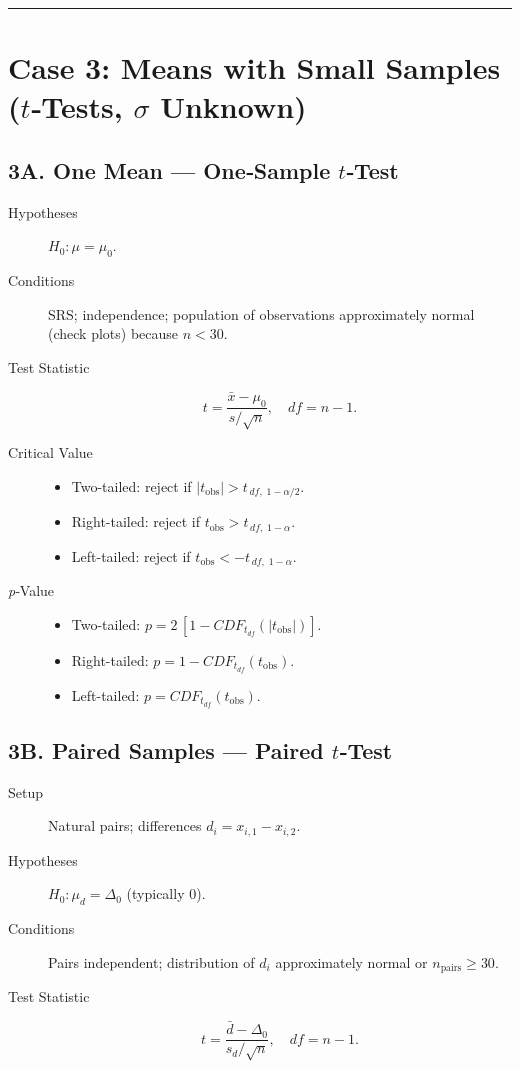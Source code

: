\documentclass[12pt]{article}
\begin{document}
\bigskip\hrule\bigskip

\section*{Case 3: Means with Small Samples ($t$‐Tests, $\sigma$ Unknown)}
\subsection*{3A. One Mean — One‐Sample $t$‐Test}
\begin{description}
    \item[Hypotheses] $H_0\!: \mu=\mu_0$.
    \item[Conditions] SRS; independence; population of observations approximately normal (check plots) because $n<30$.
    \item[Test Statistic] \[ t = \dfrac{\bar x-\mu_0}{s/\sqrt n}, \quad df = n-1. \]
    \item[Critical Value]
          \begin{itemize}
            \item Two-tailed: reject if $|t_{\text{obs}}| > t_{\,df,\;1-\alpha/2}$.
            \item Right-tailed: reject if $t_{\text{obs}} > t_{\,df,\;1-\alpha}$.
            \item Left-tailed: reject if $t_{\text{obs}} < -t_{\,df,\;1-\alpha}$.
          \end{itemize}
    \item[\emph{p}‐Value]
          \begin{itemize}
            \item Two-tailed: $p = 2\,[1 - CDF_{t_{df}}(|t_{\text{obs}}|)]$.
            \item Right-tailed: $p = 1 - CDF_{t_{df}}(t_{\text{obs}})$.
            \item Left-tailed: $p = CDF_{t_{df}}(t_{\text{obs}})$.
          \end{itemize}
\end{description}

\subsection*{3B. Paired Samples — Paired $t$‐Test}
\begin{description}
  \item[Setup] Natural pairs; differences $d_i=x_{i,1}-x_{i,2}$.
  \item[Hypotheses] $H_0\!: \mu_d=\Delta_0$ (typically 0).
  \item[Conditions] Pairs independent; distribution of $d_i$ approximately normal or $n_{\text{pairs}}\ge30$.
  \item[Test Statistic] \[ t = \dfrac{\bar d-\Delta_0}{s_d/\sqrt n}, \quad df = n-1. \]
\end{description}
\end{document}
